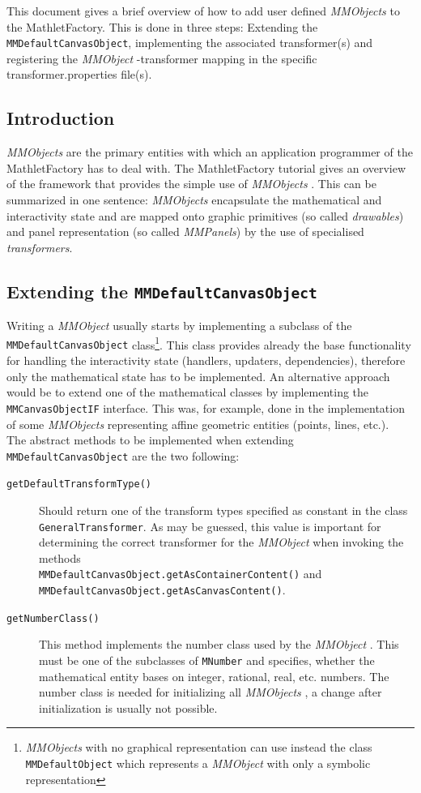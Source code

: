\documentclass[a4paper,12pt]{book}
\newcommand{\mmo}{\emph{MMObject }}
\newcommand{\mmos}{\emph{MMObjects }}
\begin{document}
This document gives a brief overview of how to add user defined \mmos to the MathletFactory. This is done in three steps: 
Extending the {\tt MMDefaultCanvasObject}, implementing the associated transformer(s) and registering the \mmo-transformer 
mapping in the specific transformer.properties file(s).
  
\subsection{Introduction}
\mmos are the primary entities with which an application programmer of the MathletFactory has to deal with. The MathletFactory 
tutorial gives an overview of the framework that provides the simple use of \mmos. This can be summarized in one sentence: \mmos
encapsulate the mathematical and interactivity state and are mapped onto graphic primitives (so called {\it drawables}) and panel 
representation (so called {\it MMPanels}) by the use of specialised {\it transformers}.

\subsection{Extending the {\tt MMDefaultCanvasObject}}
Writing a \mmo usually starts by implementing a subclass of the {\tt MMDefaultCanvasObject}
class\footnote{\mmos with no graphical representation can use instead the class {\tt MMDefaultObject} which represents a \mmo with 
only a symbolic representation}. This class provides already 
the base functionality for handling the interactivity state (handlers, updaters, dependencies), therefore only the mathematical state 
has to be implemented. An alternative approach would be to extend one of the mathematical classes by implementing the 
{\tt MMCanvasObjectIF} interface. This was, for example, done in the implementation of some \mmos representing affine geometric 
entities (points, lines, etc.).\\
The abstract methods to be implemented when extending\\ {\tt MMDefaultCanvasObject} are the two following:\\

\begin{description}
\item[{\tt getDefaultTransformType()}]
Should return one of the transform types specified as constant in the class 
{\tt GeneralTransformer}. As may be guessed, this value is important for determining the correct transformer for the 
\mmo when invoking the methods\\ {\tt MMDefaultCanvasObject.getAsContainerContent()} and\\
{\tt MMDefaultCanvasObject.getAsCanvasContent()}.\\
 
\item[{\tt getNumberClass()}] 
This method implements the number class used by the \mmo. This must be one of the subclasses
of {\tt MNumber} and specifies, whether the mathematical entity bases on integer, rational, real, etc. numbers. The number 
class is needed for initializing all \mmos, a change after initialization is usually
not possible.
\end{description}
\end{document}
